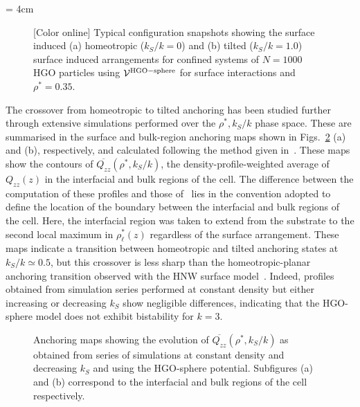 \documentclass[aps,10pt,twocolumn]{revtex4}
\newlength{\picW}   %
\newcommand{\pic}[1]{\texttt{[image: \#1]}}
\begin{document}
\picW = 4cm
\begin{figure}
    \centering
    \subfigure[$k_S/k = 0.0$]{\pic{fig_03a.ps}}
    \subfigure[$k_S/k = 1.0$]{\pic{fig_03b.ps}}
    \caption{[Color online] Typical configuration snapshots showing the surface induced (a) homeotropic ($k_S/k=0$) and (b)
    tilted ($k_S/k=1.0$) surface induced arrangements for confined systems of $N=1000$ HGO particles
    using $\mathcal{V}^{\rm HGO-sphere}$ for surface interactions and $\rho^{*} = 0.35$.}
    \label{fig:RSP_snaps}
\end{figure}

The crossover from homeotropic to tilted anchoring has been studied further through extensive simulations
performed over the $\rho^{*},k_S/k$ phase space. These are summarised in the surface and bulk-region anchoring
maps shown in Figs.~\ref{fig:RSP_phaseDia} (a) and (b), respectively, and calculated following the method given
in~\cite{BarmesCleaver04a}. These maps show the contours of $\overline{Q_{zz}}(\rho^{*},k_S/k)$, the
density-profile-weighted average of $Q_{zz}(z)$ in the interfacial and bulk regions of the cell. The difference
between the computation of these profiles and those of~\cite{BarmesCleaver04a} lies in the convention adopted to
define the location of the boundary between the interfacial and bulk regions of the cell. Here, the interfacial
region was taken to extend from the substrate to the second local maximum in $\rho^{*}_\ell(z)$ regardless of the
surface arrangement. These maps indicate a transition between homeotropic and tilted anchoring states at $k_S/k
\simeq 0.5$, but this crossover is less sharp than the homeotropic-planar anchoring transition observed with the
HNW surface model~\cite{BarmesCleaver04a}. Indeed, profiles obtained from simulation series performed at constant
density but either increasing or decreasing $k_S$ show negligible differences, indicating that the HGO-sphere
model does not exhibit bistability for $k=3$.

\picW=7cm
\begin{figure}
    \centering
    \subfigure[Interfacial region]{\pic{fig_04a.ps}}
    \subfigure[Bulk region]{\pic{fig_04b.ps}}
    \caption{Anchoring maps showing the evolution of
    $\overline{Q_{zz}}(\rho^{*},k_S/k)$ as obtained from series of simulations at constant
    density and decreasing $k_S$ and using the HGO-sphere potential. Subfigures (a) and (b)
    correspond to the interfacial and bulk regions of the cell respectively.}
    \label{fig:RSP_phaseDia}
\end{figure}
\end{document}

